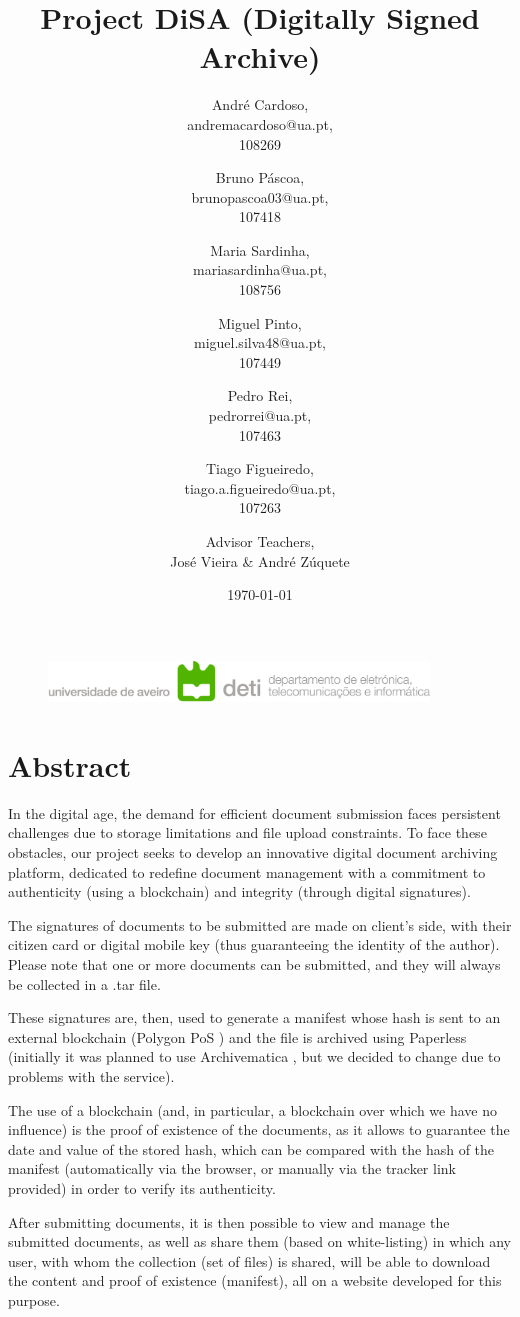 \documentclass[a4paper,11pt]{article}
\title{\textbf{Project DiSA (Digitally Signed Archive)}}
\author{
    André Cardoso,\\
    andremacardoso@ua.pt,\\
    108269\\
    \and
    Bruno Páscoa,\\
    brunopascoa03@ua.pt,\\
    107418\\
    \and
    Maria Sardinha,\\
    mariasardinha@ua.pt,\\
    108756\\
    \and
    Miguel Pinto,\\
    miguel.silva48@ua.pt,\\
    107449\\
    \and
    Pedro Rei,\\
    pedrorrei@ua.pt,\\
    107463\\
    \and  
    Tiago Figueiredo,\\
    tiago.a.figueiredo@ua.pt,\\
    107263\\
    \and
    Advisor Teachers,\\
    José Vieira \& André Zúquete\\
}
\date{\today}
\begin{document}
    \begin{figure}
        \centering
        \includegraphics[width=0.9\textwidth]{images/deti.png}\label{fig:figure}
    \end{figure}
    \maketitle
    \clearpage
    \tableofcontents
    \clearpage
    \clearpage
    \section{Abstract}\label{sec:Abstract}
        \quad In the digital age, the demand for efficient document submission faces persistent challenges due to storage limitations and file upload constraints. To face these obstacles, our project seeks to develop an innovative digital document archiving platform, dedicated to redefine document management with a commitment to authenticity (using a blockchain) and integrity (through digital signatures).

        The signatures of documents to be submitted are made on client's side, with their citizen card or digital mobile key (thus guaranteeing the identity of the author). Please note that one or more documents can be submitted, and they will always be collected in a .tar file.

        These signatures are, then, used to generate a manifest whose hash is sent to an external blockchain (Polygon PoS \cite{PolygonPos}) and the file is archived using Paperless \cite{Paperless} (initially it was planned to use Archivematica \cite{Archivematica}, but we decided to change due to problems with the service).

        The use of a blockchain (and, in particular, a blockchain over which we have no influence) is the proof of existence of the documents, as it allows to guarantee the date and value of the stored hash, which can be compared with the hash of the manifest (automatically via the browser, or manually via the tracker link provided) in order to verify its authenticity.

        After submitting documents, it is then possible to view and manage the submitted documents, as well as share them (based on white-listing) in which any user, with whom the collection (set of files) is shared, will be able to download the content and proof of existence (manifest), all on a website developed for this purpose.
\end{document}
